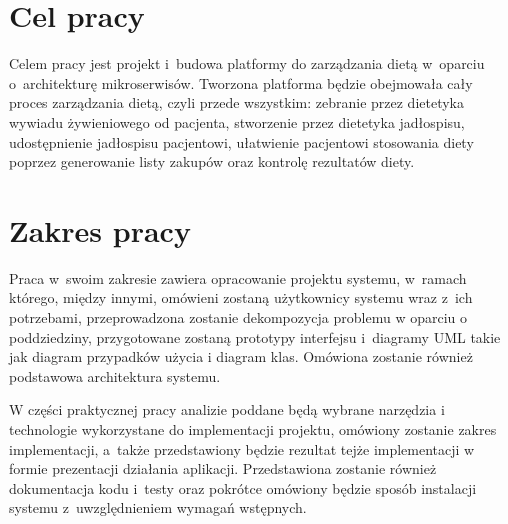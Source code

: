 \section*{Cel pracy}\label{sec:thesis-goal}

Celem pracy jest projekt i~budowa platformy do zarządzania dietą w~oparciu o~architekturę mikroserwisów.
Tworzona platforma będzie obejmowała cały proces zarządzania dietą, czyli przede wszystkim:
zebranie przez dietetyka wywiadu żywieniowego od pacjenta,
stworzenie przez dietetyka jadłospisu,
udostępnienie jadłospisu pacjentowi,
ułatwienie pacjentowi stosowania diety poprzez generowanie listy zakupów
oraz kontrolę rezultatów diety.

\section*{Zakres pracy}\label{sec:scope-of-work}

Praca w~swoim zakresie zawiera opracowanie projektu systemu, w~ramach którego, między innymi,
omówieni zostaną użytkownicy systemu wraz z~ich potrzebami,
przeprowadzona zostanie dekompozycja problemu w oparciu o poddziedziny,
przygotowane zostaną prototypy interfejsu i~diagramy UML takie jak diagram przypadków użycia i diagram klas.
Omówiona zostanie również podstawowa architektura systemu.
\par
W części praktycznej pracy analizie poddane będą wybrane narzędzia i technologie wykorzystane do implementacji projektu,
omówiony zostanie zakres implementacji, a~także przedstawiony będzie rezultat tejże implementacji w formie prezentacji działania aplikacji.
Przedstawiona zostanie również dokumentacja kodu i~testy oraz pokrótce omówiony będzie sposób instalacji systemu z~uwzględnieniem wymagań wstępnych.

\thispagestyle{normal}
